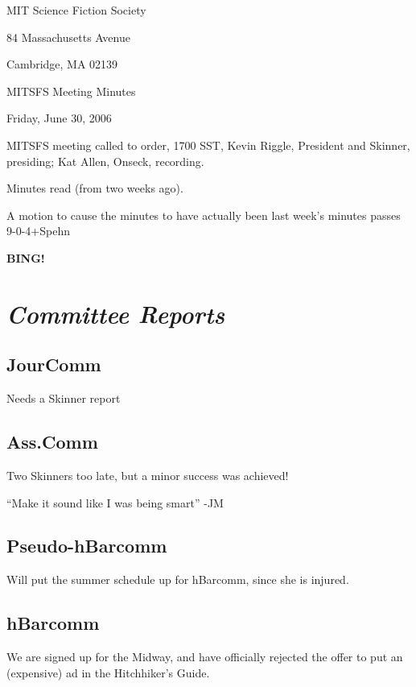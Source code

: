 \documentclass[10pt]{article}
\newcommand{\bing}{{\bf BING!} }
\newcommand{\goto}[1]{\bing \vskip 12pt \section*{{\em{#1}}}}
\begin{document}
\begin{center}

MIT Science Fiction Society

84 Massachusetts Avenue

Cambridge, MA 02139

\vspace{12pt}

MITSFS Meeting Minutes

Friday, June 30, 2006

\end{center}

\vspace{18pt}

\setlength{\parskip}{6pt}

\noindent
MITSFS meeting called to order, 1700 SST,
Kevin Riggle, President and Skinner, presiding; Kat Allen, Onseck, recording.

Minutes read (from two weeks ago).

A motion to cause the minutes to have actually been last week's
minutes passes 9-0-4+Spehn

\goto{Committee Reports}
\subsection*{JourComm}
Needs a Skinner report

\subsection*{Ass.Comm}
Two Skinners too late, but a minor success was achieved!

``Make it sound like I was being smart'' -JM

\subsection*{Pseudo-hBarcomm}
Will put the summer schedule up for hBarcomm, since she is injured.
\subsection*{hBarcomm}
We are signed up for the Midway, and have officially rejected the
offer to put an (expensive) ad in the Hitchhiker's Guide.

\end{document}
